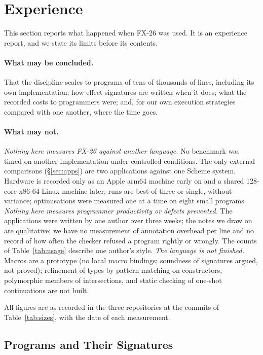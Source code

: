 \documentclass[acmsmall,screen,review]{acmart}
\newcommand{\fx}{FX-26}
\begin{document}
\section{Experience}
\label{sec:eval}

This section reports what happened when \fx{} was used. It is an
experience report, and we state its limits before its contents.

\paragraph{What may be concluded.} That the discipline scales to
programs of tens of thousands of lines, including its own
implementation; how effect signatures are written when it does; what
the recorded costs to programmers were; and, for our own execution
strategies compared with one another, where the time goes.

\paragraph{What may not.}
\emph{Nothing here measures \fx{} against another language.} No
benchmark was timed on another implementation under controlled
conditions. The only external comparisons (\S\ref{sec:apps}) are two
applications against one Scheme system. Hardware is recorded only as
an Apple arm64 machine early on and a shared 128-core x86-64 Linux
machine later; runs are best-of-three or single, without variance;
optimisations were measured one at a time on eight small programs.
\emph{Nothing here measures programmer productivity or defects
prevented.} The applications were written by one author over three
weeks; the notes we draw on are qualitative; we have no measurement of
annotation overhead per line and no record of how often the checker
refused a program rightly or wrongly. The counts of
Table~\ref{tab:usage} describe one author's style.
\emph{The language is not finished.} Macros are a prototype (no local
macro bindings; soundness of signatures argued, not proved);
refinement of types by pattern matching on constructors, polymorphic
members of intersections, and static checking of one-shot
continuations are not built.

All figures are as recorded in the three repositories at the commits of
Table~\ref{tab:sizes}, with the date of each measurement.

\subsection{Programs and Their Signatures}
\label{sec:heist}
\end{document}
